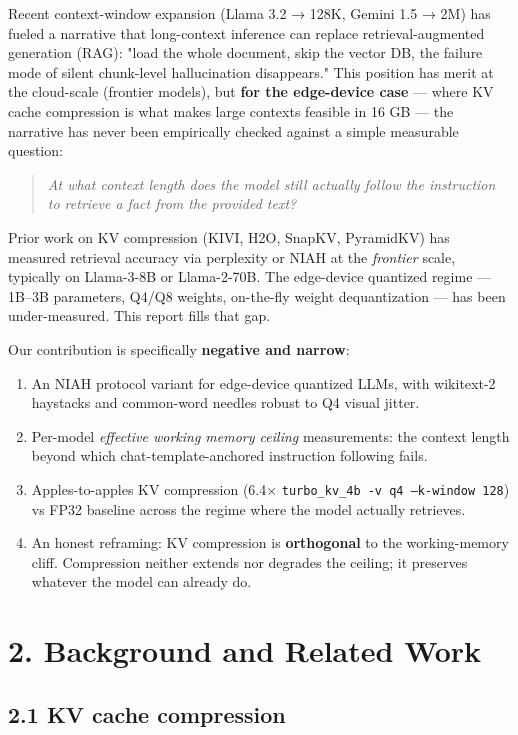\documentclass[11pt]{article}
\begin{document}
Recent context-window expansion (Llama 3.2 → 128K, Gemini 1.5 → 2M) has fueled a narrative that long-context inference can replace retrieval-augmented generation (RAG): "load the whole document, skip the vector DB, the failure mode of silent chunk-level hallucination disappears." This position has merit at the cloud-scale (frontier models), but \textbf{for the edge-device case} — where KV cache compression is what makes large contexts feasible in 16 GB — the narrative has never been empirically checked against a simple measurable question:


\begin{quote}
\textit{At what context length does the model still actually follow the instruction to retrieve a fact from the provided text?}
\end{quote}


Prior work on KV compression (KIVI, H2O, SnapKV, PyramidKV) has measured retrieval accuracy via perplexity or NIAH at the \textit{frontier} scale, typically on Llama-3-8B or Llama-2-70B. The edge-device quantized regime — 1B–3B parameters, Q4/Q8 weights, on-the-fly weight dequantization — has been under-measured. This report fills that gap.


Our contribution is specifically \textbf{negative and narrow}:


\begin{enumerate}
\item An NIAH protocol variant for edge-device quantized LLMs, with wikitext-2 haystacks and common-word needles robust to Q4 visual jitter.
\item Per-model \textit{effective working memory ceiling} measurements: the context length beyond which chat-template-anchored instruction following fails.
\item Apples-to-apples KV compression (6.4× \texttt{turbo\_kv\_4b -v q4 --k-window 128}) vs FP32 baseline across the regime where the model actually retrieves.
\item An honest reframing: KV compression is \textbf{orthogonal} to the working-memory cliff. Compression neither extends nor degrades the ceiling; it preserves whatever the model can already do.
\end{enumerate}


\section*{2. Background and Related Work}


\subsection*{2.1 KV cache compression}
\end{document}
